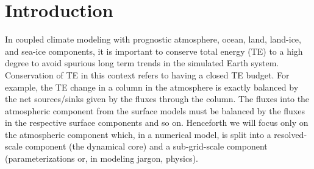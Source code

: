 \documentclass{agujournal}
\begin{document}
\begin{abstract}

\end{abstract}


%
%

% 


%
% 
% 
% 


\section{Introduction}
In coupled climate modeling with prognostic atmosphere, ocean, land, land-ice, and sea-ice components, it is important to conserve total energy (TE) to a high degree to avoid spurious long term trends in the simulated Earth system. Conservation of TE in this context refers to having a closed TE budget. For example, the TE change in a column in the atmosphere is exactly balanced by the net sources/sinks given by the fluxes through the column. The fluxes into the atmospheric component from the surface models must be balanced by the fluxes in the respective surface components and so on. Henceforth we will focus only on the atmospheric component which, in a numerical model, is split into a resolved-scale component (the dynamical core) and a sub-grid-scale component (parameterizations or, in modeling jargon, physics). 
\end{document}
